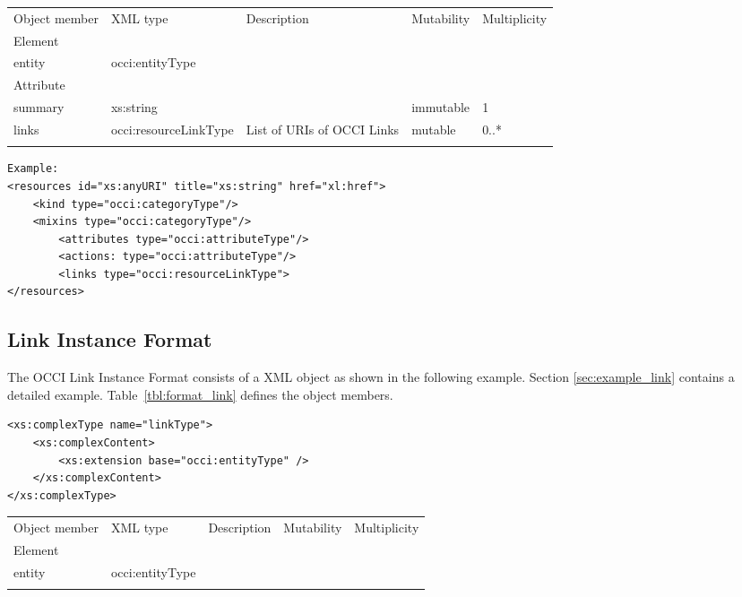 \documentclass[10pt,a4paper]{article}
\begin{document}
 {
    \begin{tabularx}{\textwidth}{llXll}
    \toprule
    Object member & XML type & Description & Mutability & Multiplicity \\
    \colrule
    Element\\
    entity & occi:entityType & & & \\

    Attribute\\
    summary & xs:string &  & immutable & 1\\
            
    links & occi:resourceLinkType & List of URIs of OCCI Links & mutable & 0..*\\
    \botrule
    \end{tabularx}
}

\begin{lstlisting}
Example:
<resources id="xs:anyURI" title="xs:string" href="xl:href">
	<kind type="occi:categoryType"/>
	<mixins type="occi:categoryType"/>
        <attributes type="occi:attributeType"/>
        <actions: type="occi:attributeType"/>
        <links type="occi:resourceLinkType"> 
</resources>
\end{lstlisting}

\subsection{Link Instance Format}
\label{sec:format_link}

The OCCI Link Instance Format consists of a XML object as shown in the
following example. Section \ref{sec:example_link} contains a detailed example.
Table~\ref{tbl:format_link} defines the object members.

\begin{lstlisting}
<xs:complexType name="linkType">
	<xs:complexContent>
		<xs:extension base="occi:entityType" />
	</xs:complexContent>
</xs:complexType>
\end{lstlisting}

 {
    \begin{tabularx}{\textwidth}{llXll}
    \toprule
    Object member & XML type & Description & Mutability & Multiplicity \\
    \colrule
    Element\\
    entity & occi:entityType & & & \\
    \botrule
    \end{tabularx}
}
\end{document}
